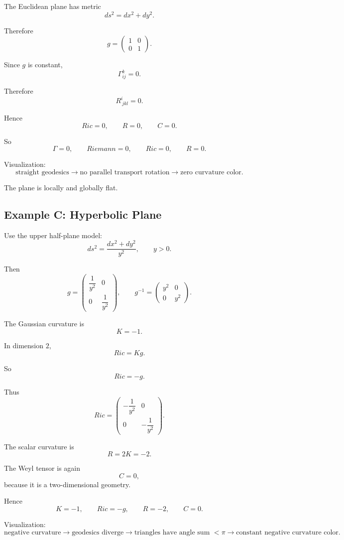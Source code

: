 \documentclass[12pt,a4paper]{article}
\theoremstyle{notespace}
\begin{document}
The Euclidean plane has metric
\[
ds^2=dx^2+dy^2.
\]

Therefore
\[
g=
\begin{pmatrix}
	1&0\\
	0&1
\end{pmatrix}.
\]

Since \(g\) is constant,
\[
\Gamma^k_{ij}=0.
\]

Therefore
\[
R^i_{\ jkl}=0.
\]

Hence
\[
Ric=0,
\qquad
R=0,
\qquad
C=0.
\]

So
\[
\boxed{
	\Gamma=0,
	\qquad
	Riemann=0,
	\qquad
	Ric=0,
	\qquad
	R=0.
}
\]

Visualization:
\[
\text{straight geodesics}
\longrightarrow
\text{no parallel transport rotation}
\longrightarrow
\text{zero curvature color}.
\]

The plane is locally and globally flat.

\subsection{Example C: Hyperbolic Plane}

Use the upper half-plane model:
\[
ds^2=\frac{dx^2+dy^2}{y^2},
\qquad y>0.
\]

Then
\[
g=
\begin{pmatrix}
	\dfrac1{y^2}&0\\
	0&\dfrac1{y^2}
\end{pmatrix},
\qquad
g^{-1}
=
\begin{pmatrix}
	y^2&0\\
	0&y^2
\end{pmatrix}.
\]

The Gaussian curvature is
\[
K=-1.
\]

In dimension \(2\),
\[
Ric=Kg.
\]

So
\[
Ric=-g.
\]

Thus
\[
Ric=
\begin{pmatrix}
	-\dfrac1{y^2}&0\\
	0&-\dfrac1{y^2}
\end{pmatrix}.
\]

The scalar curvature is
\[
R=2K=-2.
\]

The Weyl tensor is again
\[
C=0,
\]
because it is a two-dimensional geometry.

Hence
\[
\boxed{
	K=-1,
	\qquad
	Ric=-g,
	\qquad
	R=-2,
	\qquad
	C=0.
}
\]

Visualization:
\[
\text{negative curvature}
\longrightarrow
\text{geodesics diverge}
\longrightarrow
\text{triangles have angle sum }<\pi
\longrightarrow
\text{constant negative curvature color}.
\]
\end{document}
